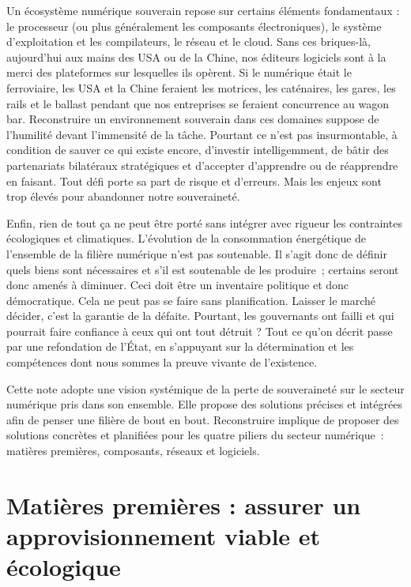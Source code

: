 \documentclass[a4paper]{article}
\begin{document}
Un écosystème numérique souverain repose sur certains éléments fondamentaux : le processeur (ou plus généralement les composants électroniques), le système d’exploitation et les compilateurs, le réseau et le cloud. Sans ces briques-là, aujourd’hui aux mains des USA ou de la Chine, nos éditeurs logiciels sont à la merci des plateformes sur lesquelles ils opèrent. Si le numérique était le ferroviaire, les USA et la Chine feraient les motrices, les caténaires, les gares, les rails et le ballast pendant que nos entreprises se feraient concurrence au wagon bar. Reconstruire un environnement souverain dans ces domaines suppose de l’humilité devant l’immensité de la tâche. Pourtant ce n’est pas insurmontable, à condition de sauver ce qui existe encore, d’investir intelligemment, de bâtir des partenariats bilatéraux stratégiques et d’accepter d’apprendre ou de réapprendre en faisant. Tout défi porte sa part de risque et d’erreurs. Mais les enjeux sont trop élevés pour abandonner notre souveraineté.

Enfin, rien de tout ça ne peut être porté sans intégrer avec rigueur les contraintes écologiques et climatiques. L’évolution de la consommation énergétique de l’ensemble de la filière numérique n’est pas soutenable\cite{ferreboeuf2019pour}. Il s’agit donc de définir quels biens sont nécessaires et s’il est soutenable de les produire~; certains seront donc amenés à diminuer. Ceci doit être un inventaire politique et donc démocratique. Cela ne peut pas se faire sans planification. Laisser le marché décider, c’est la garantie de la défaite. Pourtant, les gouvernants ont failli et qui pourrait faire confiance à ceux qui ont tout détruit ? Tout ce qu’on décrit passe par une refondation de l’État, en s’appuyant sur la détermination et les compétences dont nous sommes la preuve vivante de l’existence. 

Cette note adopte une vision systémique de la perte de souveraineté sur le secteur numérique pris dans son ensemble. Elle propose des solutions précises et intégrées afin de penser une filière de bout en bout. Reconstruire implique de proposer des solutions concrètes et planifiées pour les quatre piliers du secteur numérique~: matières premières, composants, réseaux et logiciels.

\section{Matières premières : assurer un approvisionnement viable et écologique}
\end{document}
